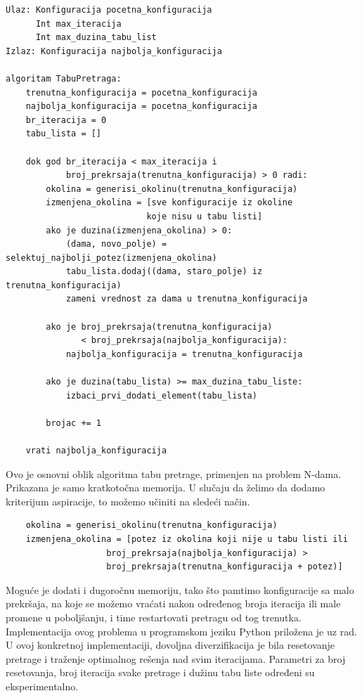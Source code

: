 \documentclass[a4paper]{article}
\begin{document}
\begin{lstlisting}
Ulaz: Konfiguracija pocetna_konfiguracija
      Int max_iteracija
      Int max_duzina_tabu_list
Izlaz: Konfiguracija najbolja_konfiguracija

algoritam TabuPretraga:
    trenutna_konfiguracija = pocetna_konfiguracija
    najbolja_konfiguracija = pocetna_konfiguracija
    br_iteracija = 0
    tabu_lista = []
    
    dok god br_iteracija < max_iteracija i
            broj_prekrsaja(trenutna_konfiguracija) > 0 radi:
        okolina = generisi_okolinu(trenutna_konfiguracija)
        izmenjena_okolina = [sve konfiguracije iz okoline 
                            koje nisu u tabu listi]
        ako je duzina(izmenjena_okolina) > 0:
            (dama, novo_polje) = selektuj_najbolji_potez(izmenjena_okolina)
            tabu_lista.dodaj((dama, staro_polje) iz trenutna_konfiguracija)
            zameni vrednost za dama u trenutna_konfiguracija
            
        ako je broj_prekrsaja(trenutna_konfiguracija) 
               < broj_prekrsaja(najbolja_konfiguracija):
            najbolja_konfiguracija = trenutna_konfiguracija
        
        ako je duzina(tabu_lista) >= max_duzina_tabu_liste:
            izbaci_prvi_dodati_element(tabu_lista)
            
        brojac += 1
    
    vrati najbolja_konfiguracija
\end{lstlisting}

Ovo je osnovni oblik algoritma tabu pretrage, primenjen na problem N-dama. Prikazana je samo kratkotočna memorija. U slučaju da želimo da dodamo kriterijum aspiracije, to možemo učiniti na sledeći način.

\begin{lstlisting}
    okolina = generisi_okolinu(trenutna_konfiguracija)
    izmenjena_okolina = [potez iz okolina koji nije u tabu listi ili 
                    broj_prekrsaja(najbolja_konfiguracija) >
                    broj_prekrsaja(trenutna_konfiguracija + potez)]
\end{lstlisting}

Moguće je dodati i dugoročnu memoriju, tako što pamtimo konfiguracije sa malo prekršaja, na koje se možemo vraćati nakon određenog broja iteracija ili male promene u poboljšanju, i time restartovati pretragu od tog trenutka. Implementacija ovog problema u programskom jeziku Python priložena je uz rad. U ovoj konkretnoj implementaciji, dovoljna diverzifikacija je bila resetovanje pretrage i traženje optimalnog rešenja nad svim iteracijama. Parametri za broj resetovanja, broj iteracija svake pretrage i dužinu tabu liste određeni su eksperimentalno.
\end{document}
